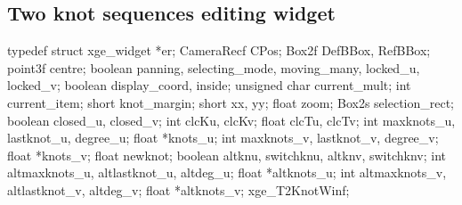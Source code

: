 \subsection{Two knot sequences editing widget}

\begin{listingC}
typedef struct {
    xge_widget  *er;
    CameraRecf  CPos;
    Box2f       DefBBox, RefBBox;
    point3f     centre;
    boolean     panning, selecting_mode, moving_many,
                locked_u, locked_v;
    boolean     display_coord, inside;
    unsigned char current_mult;
    int         current_item;
    short       knot_margin;
    short       xx, yy;
    float       zoom;
    Box2s       selection_rect;
    boolean     closed_u, closed_v;
    int         clcKu, clcKv;
    float       clcTu, clcTv;
    int         maxknots_u, lastknot_u, degree_u;
    float       *knots_u;
    int         maxknots_v, lastknot_v, degree_v;
    float       *knots_v;
    float       newknot;
    boolean     altknu, switchknu, altknv, switchknv;
    int         altmaxknots_u, altlastknot_u, altdeg_u;
    float       *altknots_u;
    int         altmaxknots_v, altlastknot_v, altdeg_v;
    float       *altknots_v;
  } xge_T2KnotWinf;
\end{listingC}


